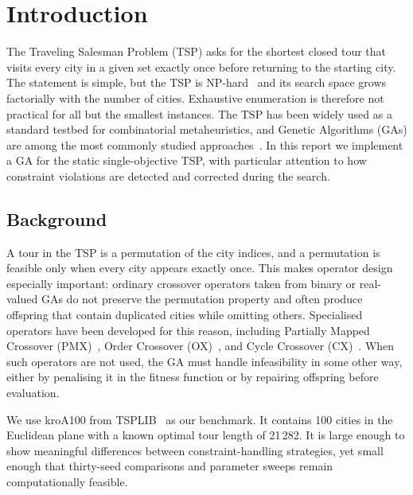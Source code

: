 \chapter{Introduction}
\label{SecIntroduction}

The Traveling Salesman Problem (TSP) asks for the shortest closed tour that
visits every city in a given set exactly once before returning to the
starting city. The statement is simple, but the TSP is
NP-hard~\cite{applegate2006traveling} and its search space grows
factorially with the number of cities. Exhaustive enumeration is therefore
not practical for all but the smallest instances. The TSP has been widely
used as a standard testbed for combinatorial metaheuristics, and Genetic
Algorithms (GAs) are among the most commonly studied
approaches~\cite{holland1975adaptation,goldberg1989genetic}. In this
report we implement a GA for the static single-objective TSP, with
particular attention to how constraint violations are detected and
corrected during the search.

\section{Background}
\label{Intro:Background}

A tour in the TSP is a permutation of the city indices, and a permutation
is feasible only when every city appears exactly once. This makes operator
design especially important: ordinary crossover operators taken from
binary or real-valued GAs do not preserve the permutation property and
often produce offspring that contain duplicated cities while omitting
others. Specialised operators have been developed for this reason,
including Partially Mapped Crossover (PMX)~\cite{goldberg1985alleles},
Order Crossover (OX)~\cite{davis1985applying}, and Cycle Crossover
(CX)~\cite{oliver1987study}. When such operators are not used, the GA
must handle infeasibility in some other way, either by penalising it in
the fitness function or by repairing offspring before evaluation.

We use kroA100 from TSPLIB~\cite{reinelt1991tsplib} as our benchmark.
It contains 100 cities in the Euclidean plane with a known optimal tour
length of 21\,282. It is large enough to show meaningful differences
between constraint-handling strategies, yet small enough that
thirty-seed comparisons and parameter sweeps remain computationally
feasible.


